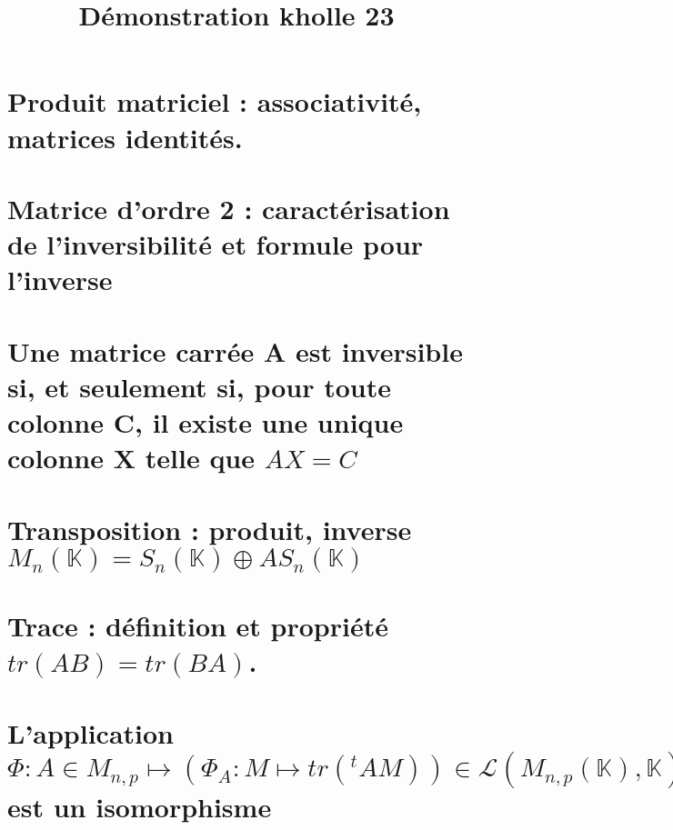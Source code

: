 \documentclass{article}
\begin{document}
\title{Démonstration kholle 23}
\date{}
\maketitle
	\renewcommand{\thesection}{\Roman{section}}
	\setlength{\parindent}{1.5cm}
	\section{ Produit matriciel : associativité, matrices identités.}
	\section{ Matrice d'ordre 2 : caractérisation de l'inversibilité et formule pour l'inverse}
	\section{Une matrice carrée A est inversible si, et seulement si, pour toute colonne C, il existe une unique colonne X telle que $AX=C$}
	\section{Transposition : produit, inverse $M_n(\mathbb K)= S_n(\mathbb K) \oplus AS_n(\mathbb K)$}
	\section{Trace : définition et propriété $tr(AB)=tr(BA)$.}
	\section{L'application $\Phi : A \in M_{n,p} \longmapsto (\Phi_A : M \mapsto tr({}^tAM))\in \mathcal L(M_{n,p}(\mathbb K), \mathbb K)$ est un isomorphisme}
\end{document}
